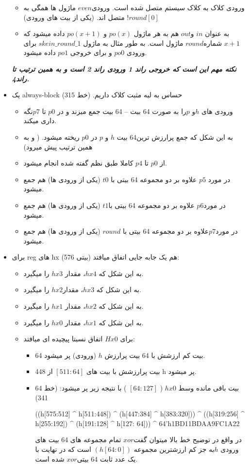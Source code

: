 \begin{itemize}
 \begin{itemize}
 \item ورودی کلاک به کلاک سیستم متصل شده است.
ورودی$ even$ ماژول ها همگی به  $!round[0]$ متصل اند. (یکی از بیت های ورودی)
\item
به عنوان $in$ و$ out $ هم به هر ماژول $po(x)$ و $po(x+1)$ داده میشود که $x+1$ شماره$ round$ ماژول است. به طور مثال به ماژول $skein\_round\_1$ برای ورودی $po0$ و برای خروجی $po1$ داده میشود.
 \end{itemize}
\textit{\textbf{ نکته مهم این است که خروجی راند 1 ورودی راند 2 است و به همین ترتیب تا راند4.
}}
\item
یک always-block حساس به لبه مثبت کلاک داریم. (خط 315)
\begin{itemize}
\item
ورودی های $h $و $p $را به صورت 64 بیت – 64 بیت جمع میزند و در $p0$ تا $p7$نگه داری میکند.
\item
به این شکل که جمع پرارزش ترین64 بیت $h$ و $p$ در $p0$ ریخته میشود. ( و به همین ترتیب پیش میرود)
\item
از $p0$ تا $p4$ کاملا طبق نظم گفته شده انجام میشود.
\item
در مورد $p5$ علاوه بر دو مجموعه 64 بیتی با $t0$ (یکی از ورودی ها) هم جمع میشود.
\item
در مورد$ p6$ علاوه بر دو مجموعه 64 بیتی با$ t1$ (یکی از ورودی ها) هم جمع میشود.
\item
در مورد$ p7 $علاوه بر دو مجموعه 64 بیتی با $round$ (یکی از ورودی ها) هم جمع میشود.
\end{itemize}
\item
برای reg های hx (576 بیتی) هم یک جابه جایی اتفاق میافتد:
\begin{itemize}
\item
به این شکل که $hx4$، مقدار $hx3$ را میگیرد.
\item
به این شکل که $hx3$، مقدار$ hx2$ را میگیرد.
\item
به این شکل که $hx2$، مقدار $hx1$ را میگیرد.
\item
به این شکل که $hx1$، مقدار $hx0$ را میگیرد.
\item
برای $Hx0$ اتفاق نسبتا پیچیده ای میافتد:
\begin{itemize}
\item
64 بیت کم ارزشش با 64 بیت پرارزش $h$ (ورودی) پر میشود.
\item
448 بیت پرارزشش  با بیت های $[511:64]$ از h پر میشود.
\item
64 بیت باقی مانده وسط $hx0$ ( $[64:127]$ ) با نتیجه زیر پر میشود:  (خط 341)
\begin{code}
((h[575:512] ^ h[511:448]) ^ (h[447:384] ^ h[383:320])) ^ ((h[319:256] ^ h[255:192]) ^  (h[191:128] ^ h[127: 64])) ^ 64'h1BD11BDAA9FC1A22
\end{code}

در واقع در توضیح خط بالا میتوان گفت$ xor$ تمام مجموعه های 64 بیت های ورودی $h $به جز کم ارزشترین مجموعه $( h[64:0] )$ است که در نهایت با یک عدد ثابت 64 بیتی$ xor$ شده است.

\end{itemize}
\end{itemize}
\end{itemize}

\subsection{}
